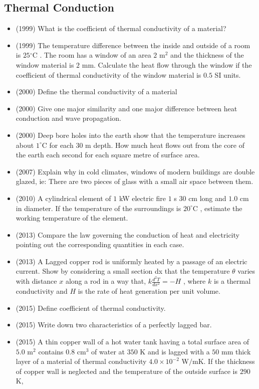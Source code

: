\documentclass{article}
\begin{document}
\subsection{Thermal Conduction}
\begin{itemize}
\item (1999)  What is the coefficient of thermal conductivity of a material?
\item (1999)  The temperature difference between the inside and outside of a room is $ 25​^{\circ}$C . The room has a window of an area $ 2$ m$ ​^{2}$ and the thickness of the window material is $ 2$ mm. Calculate the heat flow through the window if the coefficient of thermal conductivity of the window material is $ 0.5$ SI units.
\item (2000)  Define the thermal conductivity of a material
\item (2000)  Give one major similarity and one major difference between heat conduction and wave propagation.
\item (2000)  Deep bore holes into the earth show that the temperature increases about $ 1^{\circ}$C for each $ 30$ m depth. How much heat flows out from the core of the earth each second for each square metre of surface area.
\item (2007)  Explain why in cold climates, windows of modern buildings are double glazed, ie: There are two pieces of glass with a small air space between them.
\item (2010)  A cylindrical element of $ 1$ kW electric fire $ 1$ s $ 30$ cm long and $ 1.0$ cm in  diameter. If the temperature of the surroundings is $ 20^{\circ}$C , estimate the working temperature of the element.
\item (2013)  Compare the law governing the conduction of heat and electricity pointing out the corresponding quantities in each case.
\item (2013)  A Lagged copper rod is uniformly heated by a passage of an electric current. Show by considering a small section dx that the temperature $ \theta $ varies with distance $ x$ along a rod in a way that, $ k\frac{d^{2}T}{dx^{2}}=-H$ , where $ k$ is a thermal conductivity and $ H$ is the rate of heat generation per unit volume.
\item (2015)  Define coefficient of thermal conductivity.
\item (2015)  Write down two characteristics of a perfectly lagged bar.
\item (2015)  A thin copper wall of a hot water tank having a total surface area of $ 5.0$ m$ ^{2}$ contains $ 0.8$ cm$ ^{3}$ of water at $ 350$ K and is lagged with a $ 50$ mm thick layer of a material of thermal conductivity $ 4.0\times10^{-2}$ W$/$mK. If the thickness of copper wall is neglected and the temperature of the outside surface is $ 290$ K,\begin{itemize}

\end{itemize}
\end{itemize}
\end{document}

